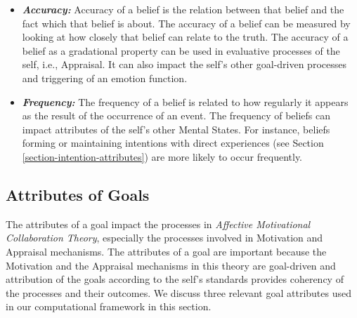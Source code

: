 \documentclass[12pt]{report}
\begin{document}
\begin{itemize}
  \item \textbf{\textit{Accuracy:}} Accuracy of a belief is the relation between
  that belief and the fact which that belief is about. The accuracy of a belief
  can be measured by looking at how closely that belief can relate to the truth.
  The accuracy of a belief as a gradational property can be used in evaluative
  processes of the self, i.e., Appraisal. It can also impact the self's other
  goal-driven processes and triggering of an emotion function.
  
  \item \textbf{\textit{Frequency:}} The frequency of a belief is related to how
  regularly it appears as the result of the occurrence of an event. The
  frequency of beliefs can impact attributes of the self's other Mental States.
  For instance, beliefs forming or maintaining intentions with direct
  experiences (see Section \ref{section-intention-attributes}) are more likely
  to occur frequently.
\end{itemize}

\subsection{Attributes of Goals}
\label{section-goal-attributes}

The attributes of a goal impact the processes in \textit{Affective Motivational
Collaboration Theory}, especially the processes involved in Motivation and
Appraisal mechanisms. The attributes of a goal are important because the
Motivation and the Appraisal mechanisms in this theory are goal-driven and
attribution of the goals according to the self's standards provides coherency of
the processes and their outcomes. We discuss three relevant goal attributes used
in our computational framework in this section.
\end{document}
